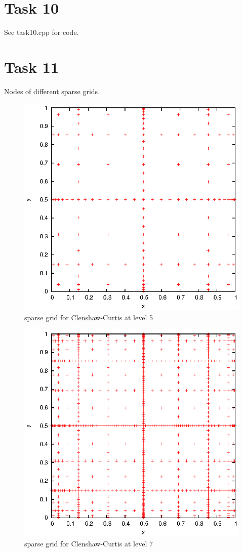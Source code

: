 \documentclass[]{article}
\begin{document}
\section*{Task 10}
See task10.cpp for code.

\section*{Task 11}
Nodes of different sparse grids.\\
\begin{figure}[!ht]
\centering
\includegraphics[width=.9\textwidth]{task11_cc5}
\caption{sparse grid for Clenshaw-Curtis at level 5}
\label{fig:Task11a}
\end{figure}

\begin{figure}[!ht]
\centering
\includegraphics[width=.9\textwidth]{task11_cc7}
\caption{sparse grid for Clenshaw-Curtis at level 7}
\label{fig:Task11b}
\end{figure}
\end{document}

